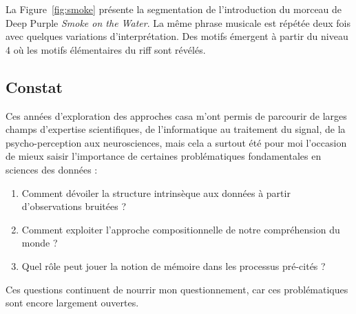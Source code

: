 
  La Figure~\ref{fig:smoke} présente la segmentation de l'introduction du morceau de Deep Purple \emph{Smoke on the Water}. La même phrase musicale est répétée deux fois avec quelques variations d'interprétation. Des motifs émergent à partir du niveau 4 où les motifs élémentaires du riff sont révélés.

  \subsection{Constat}

  Ces années d'exploration des approches casa m'ont permis de parcourir de larges champs d'expertise scientifiques, de l'informatique au traitement du signal, de la psycho-perception aux neurosciences, mais cela a surtout été pour moi l'occasion de mieux saisir l'importance de certaines problématiques fondamentales en sciences des données :
  \begin{enumerate}
    \item Comment dévoiler la structure intrinsèque aux données à partir d'observations bruitées ?
    \item Comment exploiter l'approche compositionnelle de notre compréhension du monde ?
    \item Quel rôle peut jouer la notion de mémoire dans les processus pré-cités ?
  \end{enumerate}
  Ces questions continuent de nourrir mon questionnement, car ces problématiques sont encore largement ouvertes.

